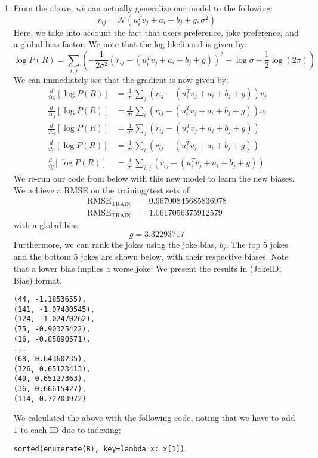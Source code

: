 \documentclass{harvardml}
\theoremstyle{plain}
\begin{document}
\begin{enumerate}[label=(\alph*)]
 \item From the above, we can actually generalize our model to the following:
 $$
r_{ij} = \mathcal{N}(u_i^Tv_j + a_i + b_j + g, \sigma^2)
 $$
 Here, we take into account the fact that users preference, joke preference, and a global bias factor. We note that the log likelihood is given by:
 $$
\log P(R) = \sum_{i,j} \left(-\frac{1}{2\sigma^2} (r_{ij} - (u_i^Tv_j + a_i + b_j + g))^2 - \log \sigma - \frac{1}{2} \log (2 \pi) \right)
 $$
 We can immediately see that the gradient is now given by:
 \begin{align*}
\frac{d}{du_i}[\log P(R)] &= \frac{1}{\sigma^2} \sum_j (r_{ij} - (u_i^Tv_j + a_i + b_j + g))v_j \\
\frac{d}{dv_j}[\log P(R)] &= \frac{1}{\sigma^2} \sum_i (r_{ij} - (u_i^Tv_j + a_i + b_j + g))u_i\\
\frac{d}{da_i}[\log P(R)] &= \frac{1}{\sigma^2} \sum_j (r_{ij} - (u_i^Tv_j + a_i + b_j + g))\\
\frac{d}{db_j}[\log P(R)] &= \frac{1}{\sigma^2} \sum_i (r_{ij} - (u_i^Tv_j + a_i + b_j + g))\\
\frac{d}{dg}[\log P(R)] &= \frac{1}{\sigma^2} \sum_{i,j} (r_{ij} - (u_i^Tv_j + a_i + b_j + g))
 \end{align*}
 We re-run our code from below with this new model to learn the new biases. We achieve a RMSE on the training/test sets of:
 \begin{align*}
\text{RMSE}_{\text{TRAIN}} &= 0.96700845685836978 \\
 \text{RMSE}_{\text{TRAIN}} &= 1.0617056375912579
\end{align*}
with a global bias
$$
g = 3.32293717
$$
Furthermore, we can rank the jokes using the joke bias, $b_j$. The top 5 jokes and the bottom 5 jokes are shown below, with their respective biases. Note that a lower bias implies a worse joke! We present the results in (JokeID, Bias) format.
\begin{verbatim}
(44, -1.1853655),
(141, -1.07480545),
(124, -1.02470262),
(75, -0.90325422),
(16, -0.85890571),
...
(68, 0.64360235),
(126, 0.65123413),
(49, 0.65127363),
(36, 0.66615427),
(114, 0.72703972)
\end{verbatim}
We calculated the above with the following code, noting that we have to add $1$ to each ID due to indexing:
\begin{verbatim}
sorted(enumerate(B), key=lambda x: x[1])
\end{verbatim}


\end{enumerate}
\end{document}
